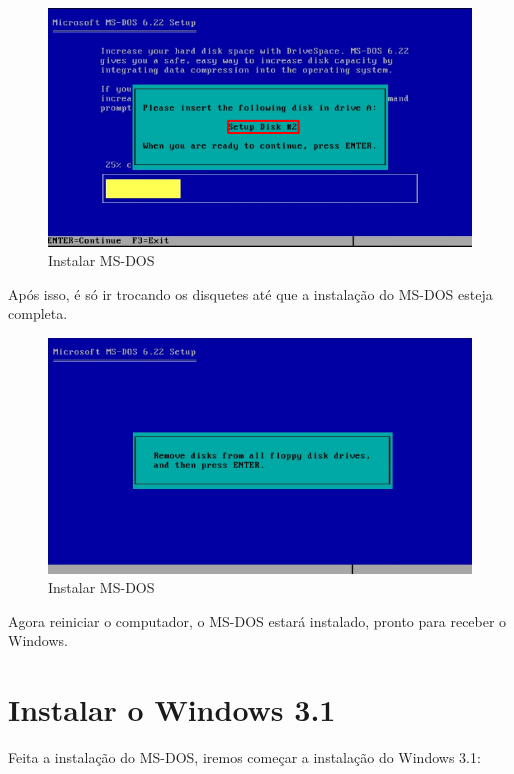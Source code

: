 \documentclass{report}
\begin{document}
\begin{figure}
\centering
\includegraphics[width=\textwidth]{Screenshot_19.png}
\caption{Instalar MS-DOS}
\label{fig:19}
\end{figure}

\newpage
Após isso, é só ir trocando os disquetes até que a instalação do MS-DOS esteja completa.

\begin{figure}
\centering
\includegraphics[width=\textwidth]{Screenshot_20.png}
\caption{Instalar MS-DOS}
\label{fig:20}
\end{figure}

\newpage
Agora reiniciar o computador, o MS-DOS estará instalado, pronto para receber o Windows.


\chapter{Instalar o Windows 3.1}

Feita a instalação do MS-DOS, iremos começar a instalação do Windows 3.1:
\end{document}
